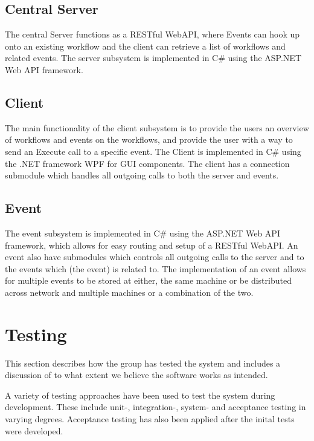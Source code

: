 \subsection{Central Server}\label{central-server}

The central Server functions as a RESTful WebAPI, where Events can hook
up onto an existing workflow and the client can retrieve a list of
workflows and related events. The server subsystem is implemented in C\#
using the ASP.NET Web API framework.

\subsection{Client}\label{client}

The main functionality of the client subsystem is to provide the users
an overview of workflows and events on the workflows, and provide the
user with a way to send an Execute call to a specific event. The Client
is implemented in C\# using the .NET framework WPF for GUI components.
The client has a connection submodule which handles all outgoing calls
to both the server and events.

\subsection{Event}\label{event}

The event subsystem is implemented in C\# using the ASP.NET Web API
framework, which allows for easy routing and setup of a RESTful WebAPI.
An event also have submodules which controls all outgoing calls to the
server and to the events which (the event) is related to. The
implementation of an event allows for multiple events to be stored at
either, the same machine or be distributed across network and multiple
machines or a combination of the two.

\section{Testing}\label{testing}

This section describes how the group has tested the system and includes
a discussion of to what extent we believe the software works as
intended.

A variety of testing approaches have been used to test the system during
development. These include unit-, integration-, system- and acceptance
testing in varying degrees. Acceptance testing has also been applied
after the inital tests were developed.

